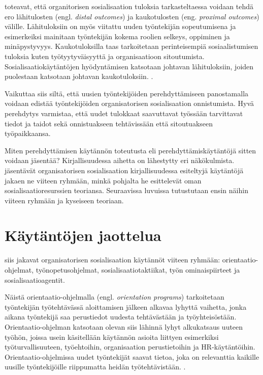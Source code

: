 \documentclass[utf8]{gradu3}
\begin{document}
\textcite{saks-gruman-2012} toteavat, että organitorisen sosialisaation tuloksia tarkasteltaessa voidaan tehdä ero lähitulosten (engl. \textit{distal outcomes}) ja kaukotulosten (eng. \textit{proximal outcomes}) välille. Lähituloksiin on myös viitattu uuden työntekijän sopeutumisena ja esimerkeiksi mainitaan työntekijän kokema roolien selkeys, oppiminen ja minäpystyvyys. Kaukotuloksilla taas tarkoitetaan perinteisempiä sosiaalistumisen tuloksia kuten työtyytyväisyyttä ja organisaatioon sitoutumista. Sosialisaatiokäytäntöjen hyödyntämisen katsotaan johtavan lähituloksiin, joiden puolestaan katsotaan johtavan kaukotuloksiin. \parencite{saks-gruman-2012}.

Vaikuttaa siis siltä, että uusien työntekijöiden perehdyttämiseen panostamalla voidaan edistää työntekijöiden organisatorisen sosialisaation onnistumista. Hyvä perehdytys varmistaa, että uudet tulokkaat saavuttavat työssään tarvittavat tiedot ja taidot sekä onnistuakseen tehtävissään että sitoutuakseen työpaikkaansa.

Miten perehdyttämisen käytännön toteutusta eli perehdyttämiskäytäntöjä sitten voidaan jäsentää? Kirjallisuudessa aihetta on lähestytty eri näkökulmista. \textcite{saks-gruman-2012} jäsentävät organisatorisen sosialisaation kirjallisuudessa esiteltyjä käytäntöjä jakaen ne viiteen ryhmään, minkä pohjalta he esittelevät oman sosialisaatioresurssien teoriansa. Seuraavissa luvuissa tutustutaan ensin näihin viiteen ryhmään ja kyseiseen teoriaan.

\section{Käytäntöjen jaottelua}

\textcite{saks-gruman-2012} siis jakavat organisatorisen sosialisaation käytännöt viiteen ryhmään: orientaatio-ohjelmat, työnopetusohjelmat, sosialisaatiotaktiikat, työn ominaispiirteet ja sosialisaatioagentit.

Näistä orientaatio-ohjelmalla (engl. \textit{orientation programs}) tarkoitetaan työntekijän työtehtävässä aloittamisen jälkeen alkavaa lyhyttä vaihetta, jonka aikana työntekijä saa perustiedot uudesta tehtävästään ja työyhteisöstään. Orientaatio-ohjelman katsotaan olevan siis lähinnä lyhyt alkukatsaus uuteen työhön, joissa usein käsitellään käytännön asioita liittyen esimerkiksi työturvallisuuteen, työehtoihin, organisaation perustietoihin ja HR-käytäntöihin. Orientaatio-ohjelmissa uudet työntekijät saavat tietoa, joka on relevanttia kaikille uusille työntekijöille riippumatta heidän työtehtävistään. \parencite{saks-gruman-2012}.
\end{document}
